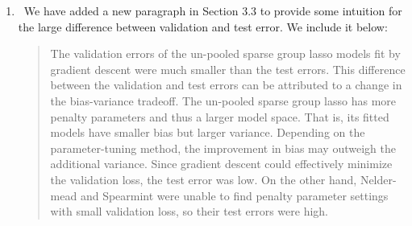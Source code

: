 \documentclass[]{article}
\newcommand{\reply}{\item[]\ }
\begin{document}
\begin{enumerate}
		\reply We have added a new paragraph in Section 3.3 to provide some intuition for the large difference between validation and test error. We include it below:
		\begin{quote}
			The validation errors of the un-pooled sparse group lasso models fit by gradient descent were much smaller than the test errors. This difference between the validation and test errors can be attributed to a change in the bias-variance tradeoff. The un-pooled sparse group lasso has more penalty parameters and thus a larger model space. That is, its fitted models have smaller bias but larger variance. Depending on the parameter-tuning method, the improvement in bias may outweigh the additional variance. Since gradient descent could effectively minimize the validation loss, the test error was low. On the other hand, Nelder-mead and Spearmint were unable to find penalty parameter settings with small validation loss, so their test errors were high.
		\end{quote}
		
	\end{enumerate} 
	
\end{document}
